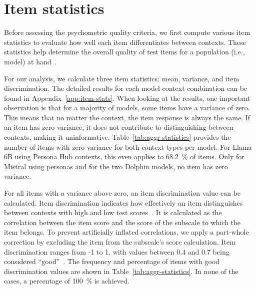 \documentclass{DESSThesis}
\begin{document}
\section{Item statistics}

Before assessing the psychometric quality criteria, we first compute various item statistics to evaluate how well each item differentiates between contexts. These statistics help determine the overall quality of test items for a population (i.e., model) at hand~\cite{moosbrugger_testtheorie_2020}.

For our analysis, we calculate three item statistics: mean, variance, and item discrimination. The detailed results for each model-context combination can be found in Appendix~\ref{app:item-stats}. 
When looking at the results, one important observation is that for a majority of models, some items have a variance of zero. This means that no matter the context, the item response is always the same. If an item has zero variance, it does not contribute to distinguishing between contexts, making it uninformative. Table~\ref{tab:aggr-statistics} provides the number of items with zero variance for both context types per model. For Llama 6B using Persona Hub contexts, this even applies to 68.2~\% of items. Only for Mistral using personas and for the two Dolphin models, no item has zero variance.

For all items with a variance above zero, an item discrimination value can be calculated. Item discrimination indicates how effectively an item distinguishes between contexts with high and low test scores~\cite{moosbrugger_testtheorie_2020}. It is calculated as the correlation between the item score and the score of the subscale to which the item belongs. To prevent artificially inflated correlations, we apply a part-whole correction by excluding the item from the subscale's score calculation. Item discrimination ranges from -1 to 1, with values between 0.4 and 0.7 being considered ``good''~\cite{moosbrugger_testtheorie_2020}. 
The frequency and percentage of items with good discrimination values are shown in Table~\ref{tab:aggr-statistics}. In none of the cases, a percentage of 100~\% is achieved. 
\end{document}
